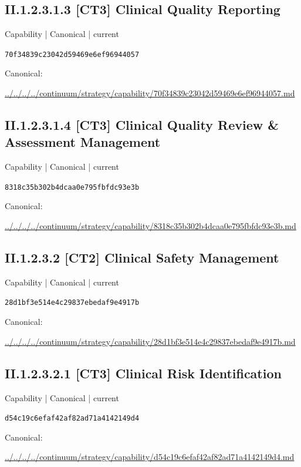 \documentclass[10pt,a4paper]{article}
\begin{document}
\subsection*{II.1.2.3.1.3 [CT3] Clinical Quality Reporting}
{\small Capability | Canonical | current}\par
\texttt{70f34839c23042d59469e6ef96944057}\par
Canonical: \par
{\footnotesize\url{../../../../continuum/strategy/capability/70f34839c23042d59469e6ef96944057.md}}\par
\subsection*{II.1.2.3.1.4 [CT3] Clinical Quality Review \& Assessment Management}
{\small Capability | Canonical | current}\par
\texttt{8318c35b302b4dcaa0e795fbfdc93e3b}\par
Canonical: \par
{\footnotesize\url{../../../../continuum/strategy/capability/8318c35b302b4dcaa0e795fbfdc93e3b.md}}\par
\subsection*{II.1.2.3.2 [CT2] Clinical Safety Management}
{\small Capability | Canonical | current}\par
\texttt{28d1bf3e514e4c29837ebedaf9e4917b}\par
Canonical: \par
{\footnotesize\url{../../../../continuum/strategy/capability/28d1bf3e514e4c29837ebedaf9e4917b.md}}\par
\subsection*{II.1.2.3.2.1 [CT3] Clinical Risk Identification}
{\small Capability | Canonical | current}\par
\texttt{d54c19c6efaf42af82ad71a4142149d4}\par
Canonical: \par
{\footnotesize\url{../../../../continuum/strategy/capability/d54c19c6efaf42af82ad71a4142149d4.md}}\par
\end{document}
